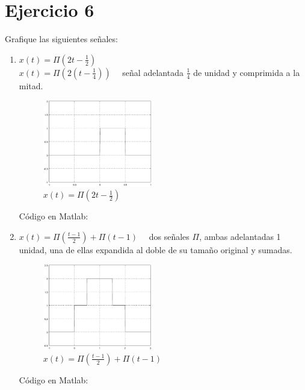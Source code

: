 \documentclass[10pt,a4paper]{report}
\begin{document}
\section{Ejercicio 6}
Grafique las siguientes señales:
\begin{enumerate}
  \item $x(t)=\Pi \left(2t-\frac{1}{2}\right)$\\
  $x(t)=\Pi \left(2\left(t-\frac{1}{4}\right)\right)\quad$ señal adelantada $\frac{1}{4}$ de unidad y comprimida a la mitad.
    \begin{figure}[H]
      \begin{center}
        \includegraphics[width=0.45\textwidth]{./Ejercicio6/IncisoA}
        \caption{$x(t)=\Pi \left(2t-\frac{1}{2}\right)$}
        \label{fig:Inciso A}
      \end{center}
    \end{figure}
    Código en Matlab:
    
  \item $x\left(t\right)=\Pi\left(\frac{t-1}{2}\right)+\Pi\left(t-1\right)\quad$ dos señales $\Pi$, ambas adelantadas 1 unidad, una de ellas expandida al doble de su tamaño original y sumadas.
    \begin{figure}[H]
      \begin{center}
        \includegraphics[width=0.45\textwidth]{./Ejercicio6/IncisoB}
        \caption{$x\left(t\right)=\Pi\left(\frac{t-1}{2}\right)+\Pi\left(t-1\right)$}
        \label{fig:Inciso B}
      \end{center}
    \end{figure}
    Código en Matlab:
    
\end{enumerate}
\end{document}
